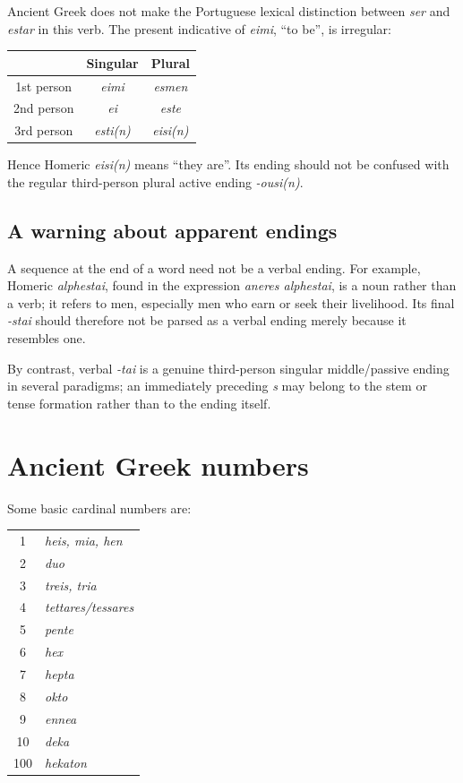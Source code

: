 Ancient Greek does not make the Portuguese lexical distinction between
\emph{ser} and \emph{estar} in this verb.  The present indicative of
\emph{eimi}, ``to be'', is irregular:
\begin{center}
\begin{tabular}{c|cc}
 & Singular & Plural \\
\hline
1st person & \emph{eimi} & \emph{esmen} \\
2nd person & \emph{ei} & \emph{este} \\
3rd person & \emph{esti(n)} & \emph{eisi(n)}
\end{tabular}
\end{center}
Hence Homeric \emph{eisi(n)} means ``they are''.  Its ending should not be
confused with the regular third-person plural active ending \emph{-ousi(n)}.

\subsection{A warning about apparent endings}
\label{subsection-apparent-endings}

A sequence at the end of a word need not be a verbal ending.  For example,
Homeric \emph{alphestai}, found in the expression \emph{aneres alphestai}, is
a noun rather than a verb; it refers to men, especially men who earn or seek
their livelihood.  Its final \emph{-stai} should therefore not be parsed as a
verbal ending merely because it resembles one.

By contrast, verbal \emph{-tai} is a genuine third-person singular
middle/passive ending in several paradigms; an immediately preceding
\emph{s} may belong to the stem or tense formation rather than to the ending
itself.

\section{Ancient Greek numbers}
\label{section-ancient-greek-numbers}

Some basic cardinal numbers are:
\begin{center}
\begin{tabular}{c|l}
1 & \emph{heis, mia, hen} \\
2 & \emph{duo} \\
3 & \emph{treis, tria} \\
4 & \emph{tettares/tessares} \\
5 & \emph{pente} \\
6 & \emph{hex} \\
7 & \emph{hepta} \\
8 & \emph{okto} \\
9 & \emph{ennea} \\
10 & \emph{deka} \\
100 & \emph{hekaton}
\end{tabular}
\end{center}

